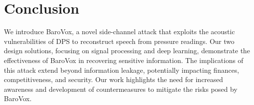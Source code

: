 \section{Conclusion}
We introduce BaroVox, a novel side-channel attack that exploits the acoustic vulnerabilities of DPS to reconstruct speech from pressure readings. Our two design solutions, focusing on signal processing and deep learning, demonstrate the effectiveness of BaroVox in recovering sensitive information. The implications of this attack extend beyond information leakage, potentially impacting finances, competitiveness, and security. Our work highlights the need for increased awareness and development of countermeasures to mitigate the risks posed by BaroVox. 